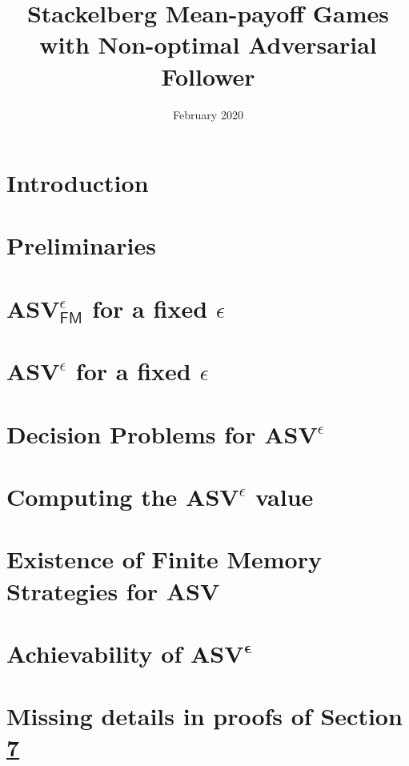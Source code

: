 \documentclass{article}
\title{\textbf{Stackelberg Mean-payoff Games with Non-optimal Adversarial Follower}}
\author{}
\date{February 2020}
\begin{document}
\maketitle

\section{Introduction} 
  \label{sec:intro}
  

\section{Preliminaries}
  \label{sec:prelim}
  

\section{$\mathbf{ASV}^{\epsilon}_{\mathsf{FM}}$ for a fixed $\epsilon$}
  \label{sec:FMStrategy}
  

\section{$\mathbf{ASV}^{\epsilon}$ for a fixed $\epsilon$}
  

\section{Decision Problems for $\mathbf{ASV}^{\epsilon}$}
  

\section{Computing the $\mathbf{ASV}^{\epsilon}$ value}
  

\section{Existence of Finite Memory Strategies for ASV}
  \label{sec:FMASV}
  
  

\section{Achievability of $\mathbf{ASV^{\epsilon}}$}
  



\appendix
\pagebreak
\section{Missing details in proofs of Section \ref{sec:FMASV}}

\end{document}
